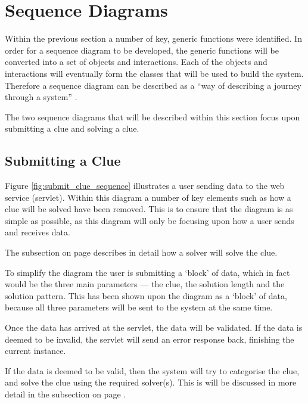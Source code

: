 \section{Sequence Diagrams}
\label{sec:sequence_diagrams}

Within the previous  section a number of key, generic 
functions were identified. In order for a sequence diagram to be developed, 
the generic functions will be converted into a set of objects and interactions.
Each of the objects and interactions will eventually form the classes that will 
be used to build the system. Therefore a sequence diagram can be described as 
a ``way of describing a journey through a system'' \citep{lunn03}.

The two sequence diagrams that will be described within this section focus upon 
submitting a clue and solving a clue.


\subsection{Submitting a Clue}
\label{sub:submitting_a_clue}

Figure \ref{fig:submit_clue_sequence} illustrates a user sending data to the 
web service (servlet). Within this diagram a number of key elements such as how
a clue will be solved have been removed. This is to ensure that the diagram is 
as simple as possible, as this diagram will only be focusing upon how a user 
sends and receives data. 

The  subsection on page 
\pageref{fig:submit_clue_sequence} describes in detail how a solver will solve 
the clue.

To simplify the diagram the user is submitting a `block' of data, which in fact 
would be the three main parameters --- the clue, the solution length and the 
solution pattern. This has been shown upon the diagram as a `block' of data, 
because all three parameters will be sent to the system at the same time.

Once the data has arrived at the servlet, the data will be validated. If the 
data is deemed to be invalid, the servlet will send an error response back, 
finishing the current instance.

If the data is deemed to be valid, then the system will try to categorise the 
clue, and solve the clue using the required solver(s). This is will be discussed
in more detail in the  subsection on page 
\pageref{fig:submit_clue_sequence}.

